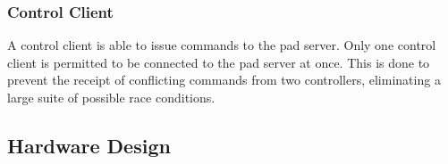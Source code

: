 \subsubsection{Control Client}

A control client is able to issue commands to the pad server. Only one control client is permitted to be connected to
the pad server at once. This is done to prevent the receipt of conflicting commands from two controllers, eliminating a
large suite of possible race conditions.

\subsection{Hardware Design}
